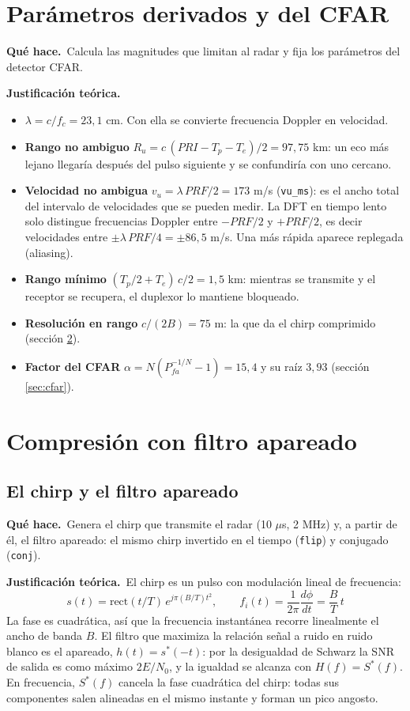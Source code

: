 \documentclass[11pt]{article}
\newcommand{\codigo}[2]{}
\newcommand{\teoria}{\par\textcolor{verde}{\textbf{Justificación teórica.}}\ }
\newcommand{\hace}{\par\textcolor{verde}{\textbf{Qué hace.}}\ }
\newcommand{\archivo}[1]{\texttt{#1}}
\begin{document}
\section{Parámetros derivados y del CFAR}
\codigo{49}{64}
\hace Calcula las magnitudes que limitan al radar y fija los parámetros del detector CFAR.

\teoria
\begin{itemize}
  \item $\lambda = c/f_c = 23{,}1$ cm. Con ella se convierte frecuencia Doppler en velocidad.
  \item \textbf{Rango no ambiguo} $R_u = c\,(PRI - T_p - T_e)/2 = 97{,}75$ km: un eco más lejano llegaría después del pulso siguiente y se confundiría con uno cercano.
  \item \textbf{Velocidad no ambigua} $v_u = \lambda\,PRF/2 = 173$ m/s (\archivo{vu\_ms}): es el ancho total del intervalo de velocidades que se pueden medir. La DFT en tiempo lento solo distingue frecuencias Doppler entre $-PRF/2$ y $+PRF/2$, es decir velocidades entre $\pm\lambda\,PRF/4 = \pm 86{,}5$ m/s. Una más rápida aparece replegada (aliasing).
  \item \textbf{Rango mínimo} $(T_p/2 + T_e)\,c/2 = 1{,}5$ km: mientras se transmite y el receptor se recupera, el duplexor lo mantiene bloqueado.
  \item \textbf{Resolución en rango} $c/(2B) = 75$ m: la que da el chirp comprimido (sección \ref{sec:compresion}).
  \item \textbf{Factor del CFAR} $\alpha = N(P_{fa}^{-1/N} - 1) = 15{,}4$ y su raíz $3{,}93$ (sección \ref{sec:cfar}).
\end{itemize}

\section{Compresión con filtro apareado}
\label{sec:compresion}
\subsection{El chirp y el filtro apareado}
\codigo{80}{89}
\hace Genera el chirp que transmite el radar (10 $\mu$s, 2 MHz) y, a partir de él, el filtro apareado: el mismo chirp invertido en el tiempo (\archivo{flip}) y conjugado (\archivo{conj}).

\teoria El chirp es un pulso con modulación lineal de frecuencia:
\[ s(t) = \mathrm{rect}(t/T)\,e^{j\pi (B/T) t^2}, \qquad f_i(t) = \frac{1}{2\pi}\frac{d\phi}{dt} = \frac{B}{T}\,t \]
La fase es cuadrática, así que la frecuencia instantánea recorre linealmente el ancho de banda $B$. El filtro que maximiza la relación señal a ruido en ruido blanco es el apareado, $h(t) = s^*(-t)$: por la desigualdad de Schwarz la SNR de salida es como máximo $2E/N_0$, y la igualdad se alcanza con $H(f) = S^*(f)$. En frecuencia, $S^*(f)$ cancela la fase cuadrática del chirp: todas sus componentes salen alineadas en el mismo instante y forman un pico angosto.
\end{document}
